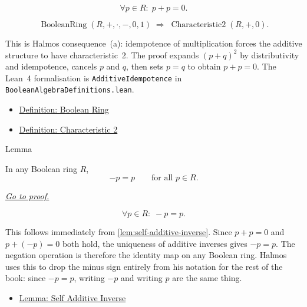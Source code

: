 \begin{remark*}
\[
\forall p \in R{:}\; p + p = 0.
\]
\end{remark*}

\begin{remark*}
\[
\operatorname{BooleanRing}(R,+,\cdot,-,0,1)
\;\Longrightarrow\;
\operatorname{Characteristic2}(R,+,0).
\]
\end{remark*}

\begin{remark*}[Interpretation]
This is Halmos consequence~(a): idempotence of multiplication
forces the additive structure to have characteristic~2.  The proof
expands $(p+q)^2$ by distributivity and idempotence, cancels $p$
and $q$, then sets $p = q$ to obtain $p + p = 0$.  The Lean~4
formalisation is \texttt{AdditiveIdempotence} in
\texttt{BooleanAlgebraDefinitions.lean}.
\end{remark*}

\begin{dependencies}
\begin{itemize}
  \item \hyperref[def:boolean-ring]{Definition: Boolean Ring}
  \item \hyperref[def:characteristic-2]{Definition: Characteristic 2}
\end{itemize}
\end{dependencies}


\begin{lemmabox}{Lemma}
\begin{lemma}
\label{lem:self-negation}
In any Boolean ring $R$,
\[
-p = p \qquad \text{for all } p \in R.
\]

\smallskip
\noindent
\hyperref[prf:self-negation]{\textit{Go to proof.}}
\end{lemma}
\end{lemmabox}

\begin{remark*}
\[
\forall p \in R{:}\; -p = p.
\]
\end{remark*}

\begin{remark*}[Interpretation]
This follows immediately from \ref{lem:self-additive-inverse}.
Since $p + p = 0$ and $p + (-p) = 0$ both hold, the uniqueness of
additive inverses gives $-p = p$.  The negation operation is
therefore the identity map on any Boolean ring.  Halmos uses this
to drop the minus sign entirely from his notation for the rest of
the book: since $-p = p$, writing $-p$ and writing $p$ are the
same thing.
\end{remark*}

\begin{dependencies}
\begin{itemize}
  \item \hyperref[lem:self-additive-inverse]{Lemma: Self Additive Inverse}
\end{itemize}
\end{dependencies}
